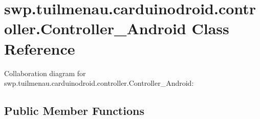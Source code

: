 \hypertarget{classswp_1_1tuilmenau_1_1carduinodroid_1_1controller_1_1_controller___android}{}\section{swp.\+tuilmenau.\+carduinodroid.\+controller.\+Controller\+\_\+\+Android Class Reference}
\label{classswp_1_1tuilmenau_1_1carduinodroid_1_1controller_1_1_controller___android}


Collaboration diagram for swp.\+tuilmenau.\+carduinodroid.\+controller.\+Controller\+\_\+\+Android\+:
\subsection*{Public Member Functions}
